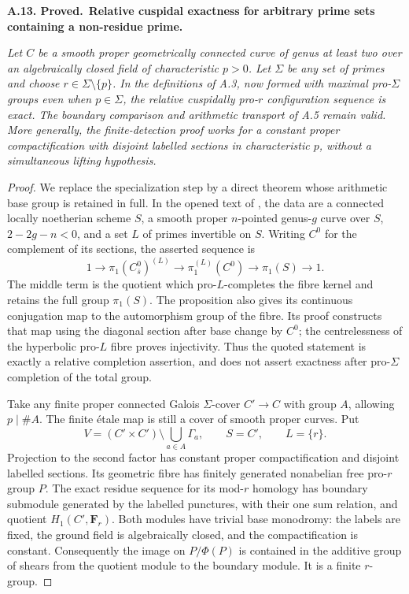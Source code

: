 \documentclass[11pt,a4paper]{article}
\newcommand{\F}{\mathbf F}
\newenvironment{claim}[3]{\par\medskip\noindent\hypertarget{#1}{\textbf{#1. #2.}}\ \textbf{#3.}\par\nopagebreak\smallskip\begingroup\itshape}{\endgroup\par\smallskip}
\begin{document}
\begin{claim}{A.13}{Proved}{Relative cuspidal exactness for arbitrary prime sets containing a non-residue prime}
Let \(C\) be a smooth proper geometrically connected curve of genus at
least two over an algebraically closed field of characteristic \(p>0\).
Let \(\Sigma\) be any set of primes and choose
\(r\in\Sigma\setminus\{p\}\). In the definitions of A.3, now formed
with maximal pro-\(\Sigma\) groups even when \(p\in\Sigma\), the
relative cuspidally pro-\(r\) configuration sequence is exact. The
boundary comparison and arithmetic transport of A.5 remain valid.
More generally, the finite-detection proof works for a constant proper
compactification with disjoint labelled sections in characteristic
\(p\), without a simultaneous lifting hypothesis.
\end{claim}
\begin{proof}
We replace the specialization step by a direct theorem whose arithmetic
base group is retained in full. In the opened text of
\citep[Proposition~2.7]{LA_Stix2005}, the data are a connected locally noetherian scheme \(S\),
a smooth proper \(n\)-pointed genus-\(g\) curve over \(S\),
\(2-2g-n<0\), and a set \(L\) of primes invertible on \(S\).
Writing \(C^0\) for the complement of its sections, the asserted
sequence is
\[
 1\longrightarrow \pi_1(C^0_{\bar s})^{(L)}
  \longrightarrow \pi_1^{(L)}(C^0)
  \longrightarrow \pi_1(S)\longrightarrow1.             \tag{A.CF.12}
\]
The middle term is the quotient which pro-\(L\)-completes the fibre
kernel and retains the full group \(\pi_1(S)\). The proposition also
gives its continuous conjugation map to the automorphism group of the
fibre. Its proof constructs that map using the diagonal section after
base change by \(C^0\); the centrelessness of the hyperbolic pro-\(L\)
fibre proves injectivity. Thus the quoted statement is exactly a
relative completion assertion, and does not assert exactness after
pro-\(\Sigma\) completion of the total group.

Take any finite proper connected Galois \(\Sigma\)-cover
\(C'\to C\) with group \(A\), allowing \(p\mid\#A\).
The finite étale map is still a cover of smooth proper curves. Put
\[
 V=(C'\times C')\setminus\bigcup_{a\in A}\Gamma_a,
 \qquad S=C',\qquad L=\{r\}.
\]
Projection to the second factor has constant proper compactification
and disjoint labelled sections. Its geometric fibre has finitely
generated nonabelian free pro-\(r\) group \(P\).
The exact residue sequence for its mod-\(r\) homology has boundary
submodule generated by the labelled punctures, with their one sum
relation, and quotient \(H_1(C',\F_r)\). Both modules have trivial
base monodromy: the labels are fixed, the ground field is algebraically
closed, and the compactification is constant. Consequently the image
on \(P/\Phi(P)\) is contained in the additive group of shears from
the quotient module to the boundary module. It is a finite
\(r\)-group.


\end{proof}
\end{document}
